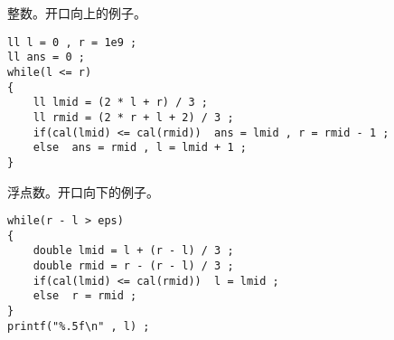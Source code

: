 \documentclass[C:/Users/12748/Desktop/latex模板/main/main.tex]{subfiles}
\begin{document}
整数。开口向上的例子。
\begin{lstlisting}
ll l = 0 , r = 1e9 ;
ll ans = 0 ;
while(l <= r)
{
	ll lmid = (2 * l + r) / 3 ;
	ll rmid = (2 * r + l + 2) / 3 ;
	if(cal(lmid) <= cal(rmid))  ans = lmid , r = rmid - 1 ;
	else  ans = rmid , l = lmid + 1 ;
}

\end{lstlisting}

浮点数。开口向下的例子。
\begin{lstlisting}
while(r - l > eps)
{
	double lmid = l + (r - l) / 3 ;
	double rmid = r - (r - l) / 3 ;
	if(cal(lmid) <= cal(rmid))  l = lmid ;
	else  r = rmid ;
}
printf("%.5f\n" , l) ;

\end{lstlisting}
\end{document}
